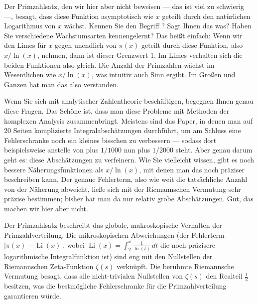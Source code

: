 \begin{spoken-clean}[01:10:33 - 01:13:42]
Der Primzahlsatz, den wir hier aber nicht beweisen --- das ist viel zu schwierig ---, besagt, dass diese Funktion asymptotisch wie $x$ geteilt durch den natürlichen Logarithmus von $x$ wächst. Kennen Sie den Begriff ? Sagt Ihnen das was? Haben Sie verschiedene Wachstumsarten kennengelernt? Das heißt einfach: Wenn wir den Limes für $x$ gegen unendlich von $\pi(x)$ geteilt durch diese Funktion, also $x / \ln(x)$, nehmen, dann ist dieser Grenzwert $1$. Im Limes verhalten sich die beiden Funktionen also gleich. Die Anzahl der Primzahlen wächst im Wesentlichen wie $x / \ln(x)$, was intuitiv auch Sinn ergibt. Im Großen und Ganzen hat man das also verstanden.

Wenn Sie sich mit analytischer Zahlentheorie beschäftigen, begegnen Ihnen genau diese Fragen. Das Schöne ist, dass man diese Probleme mit Methoden der komplexen Analysis zusammenbringt. Meistens sind das Paper, in denen man auf $20$ Seiten komplizierte Integralabschätzungen durchführt, um am Schluss eine Fehlerschranke noch ein kleines bisschen zu verbessern --- sodass dort beispielsweise anstelle von plus $1/1000$ nun plus $1/2000$ steht. Aber genau darum geht es: diese Abschätzungen zu verfeinern. Wie Sie vielleicht wissen, gibt es noch bessere Näherungsfunktionen als $x / \ln(x)$, mit denen man das noch präziser beschreiben kann. Der genaue Fehlerterm, also wie weit die tatsächliche Anzahl von der Näherung abweicht, ließe sich mit der Riemannschen Vermutung sehr präzise bestimmen; bisher hat man da nur relativ grobe Abschätzungen. Gut, das machen wir hier aber nicht.
\end{spoken-clean}

\begin{math-stroke}
\end{math-stroke}

\begin{didactic-insight}
Der Primzahlsatz beschreibt das globale, makroskopische Verhalten der Primzahlverteilung. Die mikroskopischen Abweichungen (der Fehlerterm $|\pi(x) - \operatorname{Li}(x)|$, wobei $\operatorname{Li}(x) = \int_2^x \frac{1}{\ln(t)} \, dt$ die noch präzisere logarithmische Integralfunktion ist) sind eng mit den Nullstellen der Riemannschen Zeta-Funktion $\zeta(s)$ verknüpft. Die berühmte Riemannsche Vermutung besagt, dass alle nicht-trivialen Nullstellen von $\zeta(s)$ den Realteil $\frac{1}{2}$ besitzen, was die bestmögliche Fehlerschranke für die Primzahlverteilung garantieren würde.
\end{didactic-insight}

